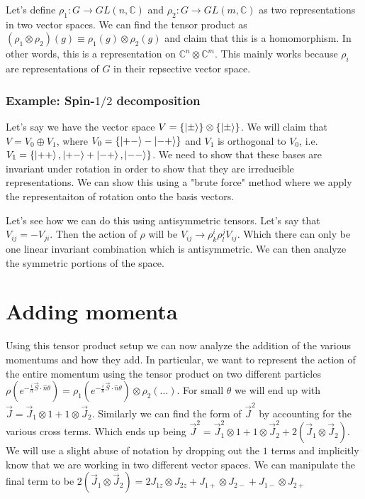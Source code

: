 Let's define $\rho_1 : G \rightarrow GL(n, \mathbb{C})$ and
$\rho_2 : G \rightarrow GL(m, \mathbb{C})$ as two representations
in two vector spaces. We can find the tensor product as
$\left(\rho_1 \otimes \rho_2\right)(g) \equiv \rho_1(g) \otimes \rho_2(g)$
and claim that this is a homomorphism. In other words, this is a representation
on $\mathbb{C}^n \otimes \mathbb{C}^m$. This mainly works
because $\rho_i$ are representations of $G$ in their repsective vector space.

\subsubsection{Example: Spin-$1/2$ decomposition}
Let's say we have the vector space $V = \left\{\Ket{\pm}\right\} \otimes 
\left\{\Ket{\pm}\right\}$. We will claim that $V = V_0 \oplus V_1$, where
$V_0 = \left\{\Ket{+-} - \Ket{-+}\right\}$ and 
$V_1$ is orthogonal to $V_0$, i.e.
$V_1 = \left\{\Ket{++}, \Ket{+-} + \Ket{-+}, \Ket{--}\right\}$.
We need to show that these bases are invariant under rotation in order to
show that they are irreducible representations. We can show this
using a "brute force" method where we apply the representaiton of rotation
onto the basis vectors.

Let's see how we can do this using antisymmetric tensors. Let's say that
$V_{ij} = -V_{ji}$. Then the action of $\rho$ will be
$V_{ij} \rightarrow \rho_k^i \rho_l^j V_{ij}$. Which there can only
be one linear invariant combination which is antisymmetric. We can then
analyze the symmetric portions of the space.

\section{Adding momenta}
Using this tensor product setup we can now analyze the addition
of the various momentums and how they add. In particular, we
want to represent the action of the entire momentum
using the tensor product on two different particles
$\rho \left( e^{- \frac{i}{\hbar} \vec{S} \cdot \hat{n} \theta}\right) =
\rho_1 \left(e^{- \frac{i}{\hbar} \vec{S}\cdot \hat{n} \theta}\right) 
\otimes \rho_2 \left(\dots\right)$. For small $\theta$ we will end up with
$\vec{J} = \vec{J}_1 \otimes 1 + 1 \otimes \vec{J}_2$. Similarly we can
find the form of $\vec{J}^2$ by accounting for the various
cross terms. Which ends up being
$\vec{J}^2 = \vec{J}_1^2 \otimes 1 +
1 \otimes \vec{J}_2^2 + 2 \left(\vec{J}_1 \otimes \vec{J}_2\right)$. We will
use a slight abuse of notation by dropping out the $1$ terms and implicitly know
that we are working in two different vector spaces.
We can manipulate the final term to be
$2 \left(\vec{J}_1 \otimes \vec{J}_2\right) =
2 J_{1z} \otimes J_{2z} + J_{1+} \otimes J_{2-} +
J_{1-} \otimes J_{2+}$

